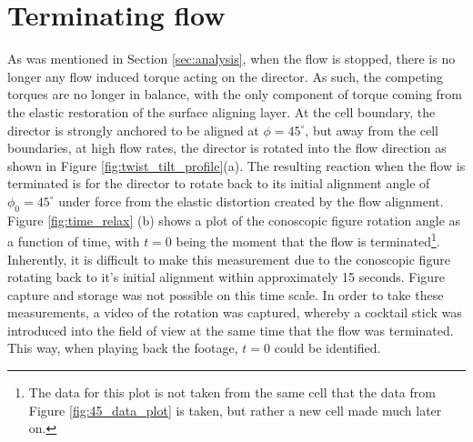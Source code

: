 \section{Terminating flow}
\label{sec:stop_flow}
As was mentioned in Section \ref{sec:analysis}, when the flow is stopped, there is no longer any flow induced torque acting on the director. As such, the competing torques are no longer in balance, with the only component of torque coming from the elastic restoration of the surface aligning layer. At the cell boundary, the director is strongly anchored to be aligned at $\phi=45^{\circ}$, but away from the cell boundaries, at high flow rates, the director is rotated into the flow direction as shown in Figure \ref{fig:twist_tilt_profile}(a). The resulting reaction when the flow is terminated is for the director to rotate back to its initial alignment angle of $\phi_0=45^{\circ}$ under force from the elastic distortion created by the flow alignment. Figure \ref{fig:time_relax} (b) shows a plot of the conoscopic figure rotation angle as a function of time, with $t=0$ being the moment that the flow is terminated\footnote{The data for this plot is not taken from the same cell that the data from Figure \ref{fig:45_data_plot} is taken, but rather a new cell made much later on.}. Inherently, it is difficult to make this measurement due to the conoscopic figure rotating back to it's initial alignment within approximately 15 seconds. Figure capture and storage was not possible on this time scale. In order to take these measurements, a video of the rotation was captured, whereby a cocktail stick was introduced into the field of view at the same time that the flow was terminated. This way, when playing back the footage, $t=0$ could be identified.

